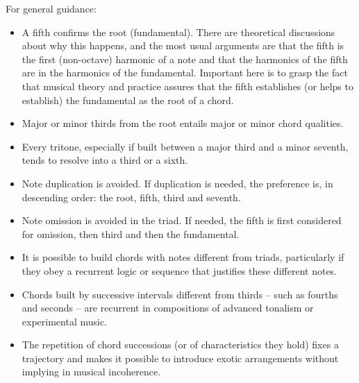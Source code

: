 For general guidance:
\begin{itemize}
        \item A fifth confirms the root (fundamental).
		There are theoretical discussions about why this happens, and the most usual arguments are that the fifth is the first (non-octave) harmonic of a note and that the harmonics of the fifth are in the harmonics of the fundamental.
                Important here is to grasp the fact that musical theory and practice assures that the fifth establishes (or helps to establish) the fundamental as the root of a chord.
        \item Major or minor thirds from the root entails major or minor chord qualities.
        \item Every tritone, especially if built between a major third and a minor seventh, tends to resolve into a third or a sixth.
        \item Note duplication is avoided. If duplication is needed, the preference is, in descending order: the root, fifth, third and seventh.
        \item Note omission is avoided in the triad. If needed, the fifth is first considered for omission, then third and then the fundamental.
        \item It is possible to build chords with notes different from triads, particularly if they obey a recurrent logic or sequence that justifies these different notes.
        \item Chords built by successive intervals different from thirds -- such as fourths and seconds -- are recurrent in compositions of advanced tonalism or experimental music.
        \item The repetition of chord successions (or of characteristics they hold) fixes a trajectory and makes it possible to 
introduce exotic arrangements without implying in musical incoherence.
\end{itemize}

